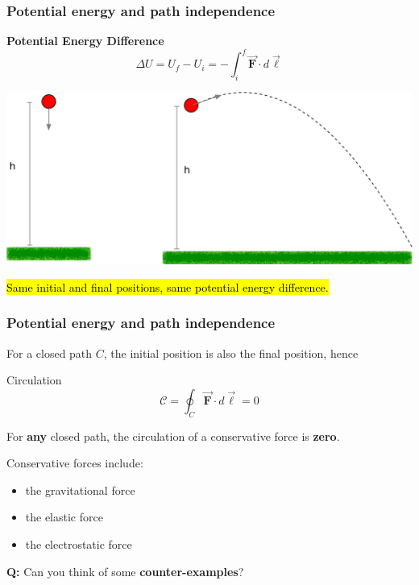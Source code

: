 \documentclass{beamer}
\makeatletter
\newcommand{\vc}[1]{\vec{\boldsymbol{#1}}}
\let\HL\hl
\renewcommand\hl{%
  \let\set@color\beamerorig@set@color
  \let\reset@color\beamerorig@reset@color
  \HL}
\makeatother
\begin{document}
\begin{frame}
	\frametitle{Potential energy and path independence}
\small


	\begin{block}{\textbf{Potential Energy Difference}}
\begin{equation}
	\Delta U=U_f-U_i=-\int_{i}^{f} \vc{F} \cdot d \vc{\ell}
	\label{eq:udef}
\end{equation}
\end{block}
\begin{center}
	
\includegraphics[width=0.8\columnwidth]{figs/paths}
\end{center}
	
\hl{Same initial and final positions, same potential energy difference.}
\end{frame}

\begin{frame}
\frametitle{Potential energy and path independence}
\small

For a closed path $C$, the initial position is also the final position, hence
\begin{block}{Circulation}
	\begin{equation}
	\mathcal{C} = \oint_C  \vc{F} \cdot d \vc{\ell} = 0
\end{equation}
\end{block}
For \textbf{any} closed path, the circulation of a conservative force is \textbf{zero}.\newline
\pause

Conservative forces include:
\begin{itemize}
	\item the gravitational force
	\item the elastic force
	\item the electrostatic force
\end{itemize}

	
\textbf{Q:} Can you think of some \textbf{counter-examples}?
\end{frame}
\end{document}
